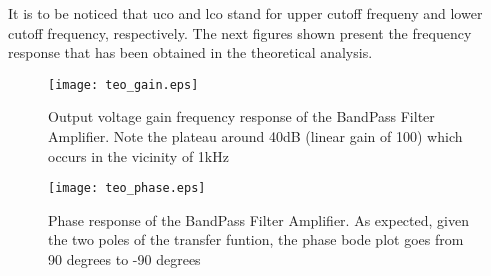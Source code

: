   It is to be noticed that uco and lco stand for upper cutoff frequeny and lower cutoff frequency, respectively.
  The next figures shown present the frequency response that has been obtained in the theoretical analysis.


\begin{figure}[H] \centering
\texttt{[image: teo\_gain.eps]}
\caption{Output voltage gain frequency response of the BandPass Filter Amplifier. Note the plateau around 40dB (linear gain of 100) which occurs in the vicinity of 1kHz}
\label{fig:gain_octa}
\end{figure}

\begin{figure}[H] \centering
\texttt{[image: teo\_phase.eps]}
\caption{Phase response of the BandPass Filter Amplifier. As expected, given the two poles of the transfer funtion, the phase bode plot goes from 90 degrees to -90 degrees}
\label{fig:phase_octa}
\end{figure}



\pagebreak


